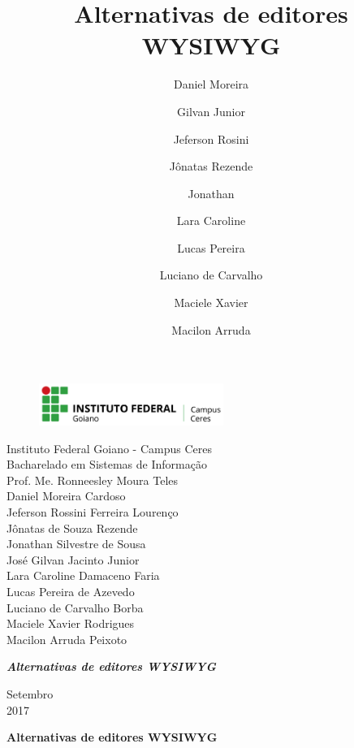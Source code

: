 \documentclass[12pt,a4paper]{article}
\title{Alternativas de editores WYSIWYG}
\author{Daniel Moreira \and Gilvan Junior \and Jeferson Rosini \and Jônatas Rezende \and Jonathan \and Lara Caroline \and Lucas Pereira \and Luciano de Carvalho \and Maciele Xavier \and Macilon Arruda}
\begin{document}
\begin{titlepage}


\begin{center}
\begin{figure}[htb]
		
		\label{figura:LogoIF}
	
		\centering
		\includegraphics[width=6cm]{logo.png} 
\end{figure}


Instituto Federal Goiano - Campus Ceres\\
Bacharelado em Sistemas de Informação\\
Prof. Me. Ronneesley Moura Teles\\\vspace{0.2cm}
Daniel Moreira Cardoso \\
Jeferson Rossini Ferreira Lourenço\\
Jônatas de Souza Rezende\\
Jonathan Silvestre de Sousa\\
José Gilvan Jacinto Junior\\
Lara Caroline Damaceno Faria\\
Lucas Pereira de Azevedo\\
Luciano de Carvalho Borba\\
Maciele Xavier Rodrigues \\
Macilon Arruda Peixoto\\



\vspace{5.0cm}

\textit{\textbf{\Large{Alternativas de editores WYSIWYG}}}\\\vspace{0.5cm}
\vspace{9.5cm}

Setembro\\
2017\\
\end{center}
\end{titlepage}



\tableofcontents

\newpage
\begin{center}
\textbf{\Large{Alternativas de editores WYSIWYG}}\\\vspace{0.5cm}
\end{center}
\end{document}
